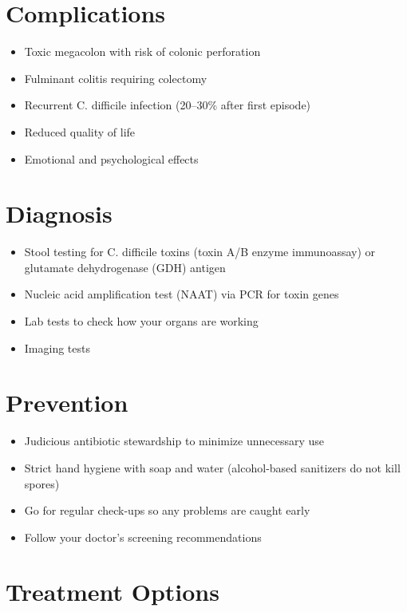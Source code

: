 \section{Complications}

\begin{itemize}[noitemsep]
  \item Toxic megacolon with risk of colonic perforation
  \item Fulminant colitis requiring colectomy
  \item Recurrent C. difficile infection (20--30\% after first episode)
  \item Reduced quality of life
  \item Emotional and psychological effects
\end{itemize}

\section{Diagnosis}

\begin{itemize}[noitemsep]
  \item Stool testing for C. difficile toxins (toxin A/B enzyme immunoassay) or glutamate dehydrogenase (GDH) antigen
  \item Nucleic acid amplification test (NAAT) via PCR for toxin genes
  \item Lab tests to check how your organs are working
  \item Imaging tests
\end{itemize}

\section{Prevention}

\begin{itemize}[noitemsep]
  \item Judicious antibiotic stewardship to minimize unnecessary use
  \item Strict hand hygiene with soap and water (alcohol-based sanitizers do not kill spores)
  \item Go for regular check-ups so any problems are caught early
  \item Follow your doctor's screening recommendations
\end{itemize}

\section{Treatment Options}

